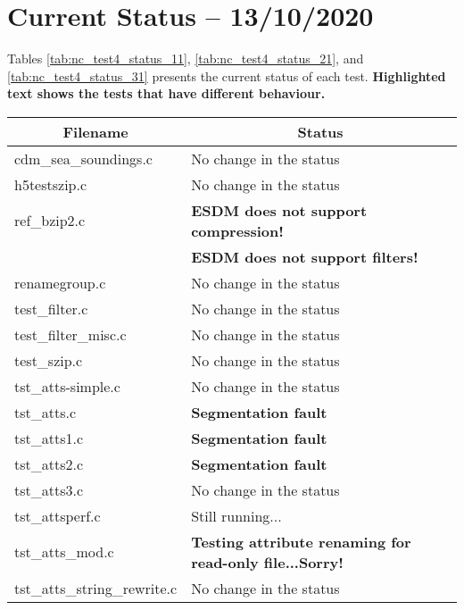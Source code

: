 \section{Current Status -- 13/10/2020}

Tables \ref{tab:nc_test4_status_11}, \ref{tab:nc_test4_status_21}, and \ref{tab:nc_test4_status_31} presents the current status of each test. \textbf{Highlighted text shows the tests that have different behaviour.}

\begin{table}[H]
\centering
\begin{tabular}{|l|l|}
\hline
\multicolumn{1}{|c|}{\parbox{4cm}{\centering Filename}} & \multicolumn{1}{c|}{Status} \\ \hline \hline
cdm\_sea\_soundings.c   &   No change in the status            \\ \hline
h5testszip.c            &   No change in the status            \\ \hline
ref\_bzip2.c            &   \textbf{ESDM does not support compression!} \\
                        &   \textbf{ESDM does not support filters!}  \\ \hline
renamegroup.c           &   No change in the status            \\ \hline
test\_filter.c          &   No change in the status            \\ \hline
test\_filter\_misc.c    &   No change in the status            \\ \hline
test\_szip.c            &   No change in the status            \\ \hline
tst\_atts-simple.c      &   No change in the status            \\ \hline
tst\_atts.c             &   \textbf{Segmentation fault}            \\ \hline
tst\_atts1.c            &   \textbf{Segmentation fault}            \\ \hline
tst\_atts2.c            &   \textbf{Segmentation fault}            \\ \hline
tst\_atts3.c            &   No change in the status            \\ \hline
tst\_attsperf.c         &   Still running...            \\ \hline
tst\_atts\_mod.c        &   \textbf{Testing attribute renaming for read-only file...Sorry!}            \\ \hline
tst\_atts\_string\_rewrite.c &  No change in the status          \\ \hline

\end{tabular}
\end{table}
